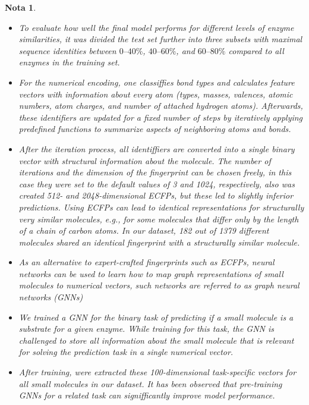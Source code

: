 \documentclass[12pt]{article}
\newtheorem{Note}{Nota}%
\begin{document}
\begin{Note}
\begin{itemize}
\item To evaluate how well the final  model performs for different levels of enzyme similarities, it was  divided the test set further into three subsets with maximal sequence identities between $0–40\%$, $40–60\%$, and $60–80\%$ compared to all enzymes in the training set.

\item For the numerical encoding, one classiffies  bond types and calculates feature vectors with information about every atom (types, masses, valences, atomic numbers, atom charges, and number of attached hydrogen atoms)\cite{2.31}.  Afterwards, these identifiers are updated for a fixed number of steps by iteratively applying predefined functions to summarize aspects of neighboring atoms and bonds. 

\item After the iteration process, all identiffiers are converted into a single binary vector with structural information about the molecule. \textsl{The number of iterations and the dimension of the fingerprint can be chosen freely, in this case they were set to the default values of 3 and 1024, respectively, also was created 512- and 2048-dimensional ECFPs, but these led to slightly inferior predictions. Using ECFPs can lead to identical representations for structurally very similar molecules, e.g., for some molecules that differ only by the length of a chain of carbon atoms.  In our dataset, 182 out of 1379 different molecules shared an identical fingerprint with a structurally similar molecule.}

\item As an alternative to expert-crafted fingerprints such as ECFPs, neural networks can be used to learn how to map graph representations of small molecules to numerical vectors, such networks are referred to as graph neural networks (GNNs)\cite{2.38,2.39,2.40} 

\item We trained a GNN for the binary task of predicting if a small molecule is a substrate for a given enzyme. While training for this task, the GNN is challenged to store all information about the small molecule that is relevant for solving the prediction task in a single numerical vector. 

\item After training, were extracted these 100-dimensional task-specific vectors for all small molecules in our dataset. It has been observed that pre-training GNNs for a related task can signifficantly improve model performance\cite{2.45,2.46}.


\end{itemize}
\end{Note}
\end{document}
